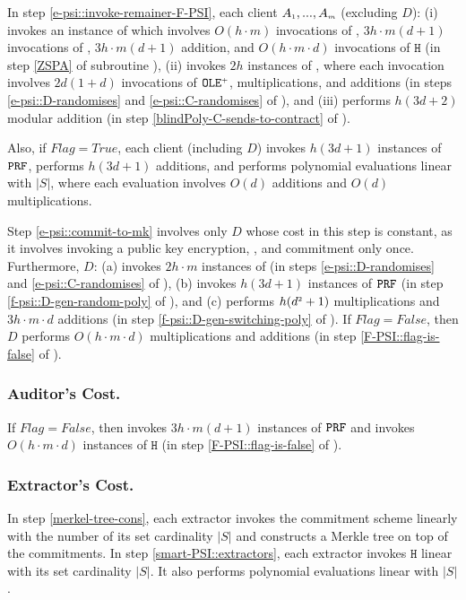In step \ref{e-psi::invoke-remainer-F-PSI}, each client   $A_{\scriptscriptstyle  1},...,    A_{\scriptscriptstyle   m}$ (excluding $D$): (i) invokes an instance of \zspaa which involves $O(h\cdot m)$ invocations of \ct, $3h\cdot m (d+1)$ invocations of \prf, $3h\cdot m (d+1)$ addition, and $O(h\cdot m\cdot d)$ invocations of $\mathtt{H}$ (in step \ref{ZSPA} of subroutine \fpsi), (ii) invokes $2h$ instances of \vopr, where each \vopr invocation involves $2d(1+d)$ invocations of $\mathtt{OLE}^{\scriptscriptstyle +}$, multiplications, and additions  (in steps \ref{e-psi::D-randomises} and \ref{e-psi::C-randomises} of \fpsi), and (iii) performs $h(3d+2)$ modular addition (in step \ref{blindPoly-C-sends-to-contract} of  \fpsi).  
 
 Also, if $Flag=True$, each client (including $D$) invokes $h (3d+1)$ instances of $\mathtt{PRF}$,  performs $h (3d+1)$ additions, and performs polynomial evaluations linear with $|S|$, where each evaluation involves  $O(d)$  additions and $O(d)$ multiplications.%
 
 Step \ref{e-psi::commit-to-mk} involves only $D$ whose cost in this step is constant, as it involves invoking a public key encryption, \prf,  and commitment only once. Furthermore, $D$:  (a) invokes $2h\cdot m$ instances of \vopr  (in steps \ref{e-psi::D-randomises} and \ref{e-psi::C-randomises} of \fpsi), (b) invokes  $h(3d+1)$ instances of $\mathtt{PRF}$ (in step \ref{f-psi::D-gen-random-poly} of \fpsi), and (c) performs $h(d^{\scriptscriptstyle 2}+1)$ multiplications and $3h\cdot m\cdot d$ additions (in step \ref{f-psi::D-gen-switching-poly} of \fpsi). If $Flag=False$, then $D$ performs $O(h\cdot m\cdot d)$ multiplications and additions (in step \ref{F-PSI::flag-is-false} of \fpsi).  

\vspace{-5mm}
 \subsubsection{Auditor's Cost.}
 
If $Flag=False$, then \aud invokes $3h\cdot m(d+1)$ instances of $\mathtt{PRF}$ and  invokes $O(h\cdot m\cdot d)$ instances of $\mathtt{H}$ (in step \ref{F-PSI::flag-is-false} of \fpsi). 


\vspace{-5mm}
 \subsubsection{Extractor's Cost.}
 
 
 In step \ref{merkel-tree-cons}, each extractor invokes the commitment scheme linearly with the number of its set cardinality $|S|$ and constructs a Merkle tree on top of the commitments. %
%
In step \ref{smart-PSI::extractors}, each extractor invokes $\mathtt{H}$ linear with its set cardinality $|S|$. It also performs polynomial evaluations linear with $|S|$. 

